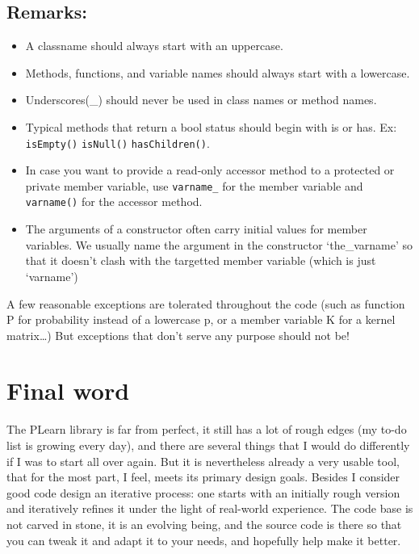 \documentclass[11pt]{book}
\begin{document}
\subsection*{Remarks:}

\begin{itemize}

\item A classname should always start with an uppercase.

\item Methods, functions, and variable names should always start with a
lowercase.

\item Underscores(\_) should never be used in class names or method
names.

\item Typical methods that return a bool status should begin with is or
has. Ex: {\tt isEmpty()} {\tt isNull()} {\tt hasChildren()}.

\item In case you want to provide a read-only accessor method to a
protected or private member variable, use {\tt varname\_} for the member
variable and {\tt varname()} for the accessor method.

\item The arguments of a constructor often carry initial values for
member variables. We usually name the argument in the constructor
`the\_varname' so that it doesn't clash with the targetted member
variable (which is just `varname')

\end{itemize}

 A few reasonable exceptions are tolerated throughout the code (such as
function P for probability instead of a lowercase p, or a member
variable K for a kernel matrix\ldots) But exceptions that don't serve
any purpose should not be!

\section{Final word}

 The PLearn library is far from perfect, it still has a lot of
rough edges (my to-do list is growing every day), and there are
several things that I would do differently if I was to start all
over again. But it is nevertheless already a very usable tool, that
for the most part, I feel, meets its primary design goals. Besides I
consider good code design an iterative process: one starts with an
initially rough version and iteratively refines it under the light
of real-world experience. The code base is not carved in stone, it
is an evolving being, and the source code is there so that you can
tweak it and adapt it to your needs, and hopefully help make it better.
\end{document}
